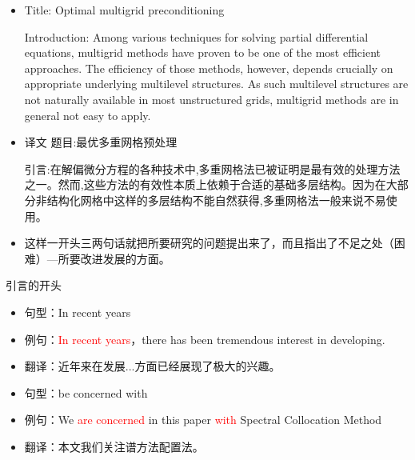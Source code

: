 \documentclass[13pt]{ctexbeamer}
\newcommand{\red}[1]{\textcolor{red}{#1}}
\begin{document}
\begin{frame}

    \begin{itemize}
        \item
        {\small  Title: Optimal multigrid preconditioning}


        {\small Introduction: Among various techniques for solving partial differential equations,  multigrid methods have proven to be one of the most efficient approaches. The efficiency of those methods, however, depends crucially on appropriate underlying multilevel structures. As such multilevel structures are not naturally  available in most unstructured grids, multigrid methods are in general not easy to apply.}

        \pause
        \item {\small  译文 \quad  题目:最优多重网格预处理}

        {\small  引言:在解偏微分方程的各种技术中,多重网格法已被证明是最有效的处理方法之一。然而,这些方法的有效性本质上依赖于合适的基础多层结构。因为在大部分非结构化网格中这样的多层结构不能自然获得,多重网格法一般来说不易使用。}
        \item 这样一开头三两句话就把所要研究的问题提出来了，而且指出了不足之处（困难）---所要改进发展的方面。
    \end{itemize}
\end{frame}

\begin{frame}{引言的开头}

    \begin{itemize}
        \item 句型：In recent years
        \item 例句：\red{In recent years}，there has been tremendous interest in developing.
        \item 翻译：近年来在发展...方面已经展现了极大的兴趣。
        \newline
        \item 句型：be concerned with
        \item 例句：We \red{are concerned} in this paper \red{with}  Spectral Collocation Method
        \item 翻译：本文我们关注谱方法配置法。

    \end{itemize}
\end{frame}
\end{document}
